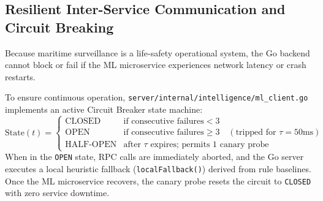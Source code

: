 \subsection{Resilient Inter-Service Communication and Circuit Breaking}
Because maritime surveillance is a life-safety operational system, the Go backend cannot block or fail if the ML microservice experiences network latency or crash restarts.

To ensure continuous operation, \texttt{server/internal/intelligence/ml\_client.go} implements an active Circuit Breaker state machine:
\begin{equation}
\text{State}(t) = 
\begin{cases} 
\text{CLOSED} & \text{if consecutive failures} < 3 \\
\text{OPEN} & \text{if consecutive failures} \ge 3 \quad (\text{tripped for } \tau = 50\text{ms}) \\
\text{HALF-OPEN} & \text{after } \tau \text{ expires; permits 1 canary probe}
\end{cases}
\end{equation}
When in the \texttt{OPEN} state, RPC calls are immediately aborted, and the Go server executes a local heuristic fallback (\texttt{localFallback()}) derived from rule baselines. Once the ML microservice recovers, the canary probe resets the circuit to \texttt{CLOSED} with zero service downtime.
